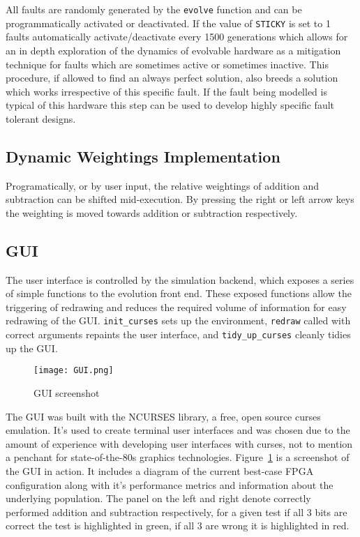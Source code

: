 All faults are randomly generated by the \texttt{evolve} function and can be
programmatically activated or deactivated. If the value of \texttt{STICKY} is
set to 1 faults automatically activate/deactivate every 1500 generations which
allows for an in depth exploration of the dynamics of evolvable hardware as a
mitigation technique for faults which are sometimes active or sometimes inactive.
This procedure, if allowed to find an always perfect solution, also breeds a solution
which works irrespective of this specific fault. If the fault being modelled is
typical of this hardware this step can be used to develop highly specific
fault tolerant designs.

\subsection{Dynamic Weightings Implementation}
Programatically, or by user input, the relative weightings of addition and subtraction
can be shifted mid-execution. By pressing the right or left arrow keys the weighting
is moved towards addition or subtraction respectively.

\subsection{GUI}
The user interface is controlled by the simulation backend, which exposes a
series of simple functions to the evolution front end. These exposed functions
allow the triggering of redrawing and reduces the required volume of information
for easy redrawing of the GUI. \texttt{init\_curses} sets up the environment,
\texttt{redraw} called with correct arguments repaints the user interface, and
\texttt{tidy\_up\_curses} cleanly tidies up the GUI.

\begin{figure}
\texttt{[image: GUI.png]}
\caption{GUI screenshot}
\label{fig:gui}
\end{figure}

The GUI was built with the NCURSES library, a free, open source curses emulation.
It's used to create terminal user interfaces and was chosen due to the amount of
experience  with developing user interfaces with curses, not to
mention a penchant for state-of-the-80s graphics technologies.
Figure~\ref{fig:gui} is a screenshot of the GUI in action. It includes a diagram
of the current best-case FPGA configuration along with it's performance metrics
and information about the underlying population. The panel on the left and right
denote correctly performed addition and subtraction respectively, for a given
test if all 3 bits are correct the test is highlighted in green, if all 3 are wrong
it is highlighted in red.

